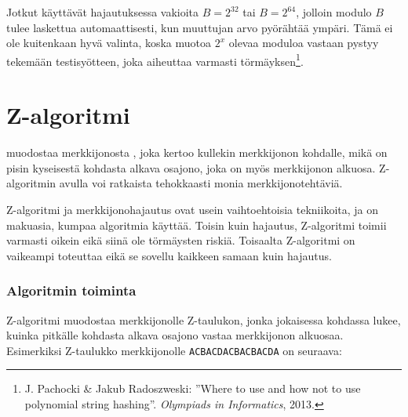 Jotkut käyttävät hajautuksessa vakioita $B=2^{32}$ tai $B=2^{64}$,
jolloin modulo $B$ tulee laskettua
automaattisesti, kun muuttujan arvo pyörähtää ympäri.
Tämä ei ole kuitenkaan hyvä valinta,
koska muotoa $2^x$ olevaa moduloa vastaan
pystyy tekemään testisyötteen, joka aiheuttaa varmasti törmäyksen\footnote{
J. Pachocki \& Jakub Radoszweski:
''Where to use and how not to use polynomial string hashing''.
\textit{Olympiads in Informatics}, 2013.
}.

\section{Z-algoritmi}


 muodostaa merkkijonosta ,
joka kertoo kullekin merkkijonon kohdalle,
mikä on pisin kyseisestä kohdasta alkava osajono,
joka on myös merkkijonon alkuosa.
Z-algoritmin avulla voi ratkaista tehokkaasti
monia merkkijonotehtäviä.

Z-algoritmi ja merkkijonohajautus ovat usein
vaihtoehtoisia tekniikoita, ja on makuasia,
kumpaa algoritmia käyttää.
Toisin kuin hajautus, Z-algoritmi toimii
varmasti oikein eikä siinä ole törmäysten riskiä.
Toisaalta Z-algoritmi on vaikeampi toteuttaa eikä
se sovellu kaikkeen samaan kuin hajautus.

\subsubsection*{Algoritmin toiminta}

Z-algoritmi muodostaa merkkijonolle Z-taulukon,
jonka jokaisessa kohdassa lukee,
kuinka pitkälle kohdasta
alkava osajono vastaa merkkijonon alkuosaa.
Esimerkiksi Z-taulukko
merkkijonolle \texttt{ACBACDACBACBACDA} on seuraava:

